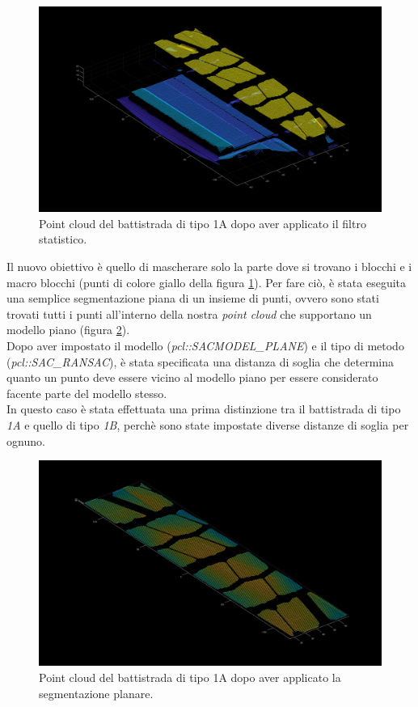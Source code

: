 \begin{figure}[H]
	\centering
	\includegraphics[width=0.8\columnwidth]{./pictures/batt_1a_analisi_2.png}
	\caption{Point cloud del battistrada di tipo 1A dopo aver applicato il filtro statistico.}\label{fig:batt_1a_analisi_2}
\end{figure}

\noindent Il nuovo obiettivo è quello di mascherare solo la parte dove si trovano i blocchi e i macro blocchi (punti di colore giallo della figura \ref{fig:batt_1a_analisi_2}). Per fare ciò, è stata eseguita una semplice segmentazione piana di un insieme di punti, ovvero sono stati trovati tutti i punti all'interno della nostra \textit{point cloud} che supportano un modello piano (figura \ref{fig:batt_1a_analisi_3}).\\
\newline
Dopo aver impostato il modello (\textit{pcl::SACMODEL\_PLANE}) e il tipo di metodo (\textit{pcl::SAC\_RANSAC}), è stata specificata una distanza di soglia che determina quanto un punto deve essere vicino al modello piano per essere considerato facente parte del modello stesso.\\
\newline
In questo caso è stata effettuata una prima distinzione tra il battistrada di tipo \textit{1A} e quello di tipo \textit{1B}, perchè sono state impostate diverse distanze di soglia per ognuno.

\begin{figure}[H]
	\centering
	\includegraphics[width=0.8\columnwidth]{./pictures/batt_1a_analisi_3.png}
	\caption{Point cloud del battistrada di tipo 1A dopo aver applicato la segmentazione planare.}\label{fig:batt_1a_analisi_3}
\end{figure}

